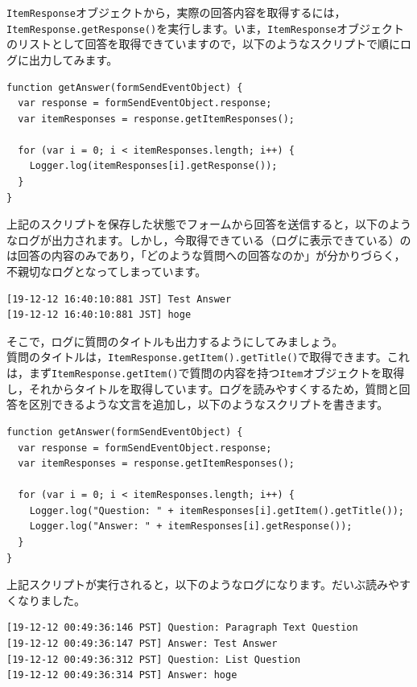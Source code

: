 \documentclass[uplatex,a4j]{jsarticle}
\begin{document}
\verb|ItemResponse|オブジェクトから，実際の回答内容を取得するには，\verb|ItemResponse.getResponse()|を実行します。いま，\verb|ItemResponse|オブジェクトのリストとして回答を取得できていますので，以下のようなスクリプトで順にログに出力してみます。

\begin{lstlisting}[basicstyle=\ttfamily\footnotesize,frame=single,caption=Event Object sample 3]
function getAnswer(formSendEventObject) {
  var response = formSendEventObject.response;
  var itemResponses = response.getItemResponses();
  
  for (var i = 0; i < itemResponses.length; i++) {
    Logger.log(itemResponses[i].getResponse());
  }
}
\end{lstlisting}

上記のスクリプトを保存した状態でフォームから回答を送信すると，以下のようなログが出力されます。しかし，今取得できている（ログに表示できている）のは回答の内容のみであり，「どのような質問への回答なのか」が分かりづらく，不親切なログとなってしまっています。


\begin{lstlisting}[basicstyle=\ttfamily\footnotesize,frame=single,caption=Event Object output example 2]
[19-12-12 16:40:10:881 JST] Test Answer
[19-12-12 16:40:10:881 JST] hoge
\end{lstlisting}

そこで，ログに質問のタイトルも出力するようにしてみましょう。\\質問のタイトルは，\verb|ItemResponse.getItem().getTitle()|で取得できます。これは，まず\verb|ItemResponse.getItem()|で質問の内容を持つ\verb|Item|オブジェクトを取得し，それからタイトルを取得しています。ログを読みやすくするため，質問と回答を区別できるような文言を追加し，以下のようなスクリプトを書きます。

\begin{lstlisting}[basicstyle=\ttfamily\footnotesize,frame=single,caption=Event Object sample 4]
function getAnswer(formSendEventObject) {
  var response = formSendEventObject.response;
  var itemResponses = response.getItemResponses();
  
  for (var i = 0; i < itemResponses.length; i++) {
    Logger.log("Question: " + itemResponses[i].getItem().getTitle());
    Logger.log("Answer: " + itemResponses[i].getResponse());
  }
}
\end{lstlisting}

上記スクリプトが実行されると，以下のようなログになります。だいぶ読みやすくなりました。

\begin{lstlisting}[basicstyle=\ttfamily\footnotesize,frame=single,caption=Event Object output example 3]
[19-12-12 00:49:36:146 PST] Question: Paragraph Text Question
[19-12-12 00:49:36:147 PST] Answer: Test Answer
[19-12-12 00:49:36:312 PST] Question: List Question
[19-12-12 00:49:36:314 PST] Answer: hoge
\end{lstlisting}
\end{document}
